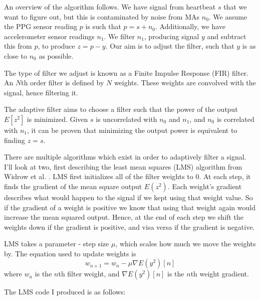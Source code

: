 \documentclass[12pt,a4paper,twoside,openany]{report}
\begin{document}
An overview of the algorithm follows. We have signal from heartbeat \(s\) that
we want to figure out, but this is contaminated by noise from MAs \(n_0\).
We assume the PPG sensor reading \(p\) is such that \(p=s+n_0\). Additionally,
we have accelerometer sensor readings \(n_1\). We filter \(n_1\), producing
signal \(y\) and subtract this from \(p\), to produce \(z=p-y\). Our aim is to
adjust the filter, such that \(y\) is as close to \(n_0\) as possible. 

The type of filter we adjust is known as a Finite Impulse Response (FIR)
filter. An \(N\)th order filter is defined by \(N\) weights.
These weights are convolved with the signal, hence filtering it.

The adaptive filter aims to choose a filter such that the power of the output 
\(E[z^2]\) is minimized. Given \(s\) is uncorrelated with \(n_0\) and \(n_1\), and \(n_0\)
is correlated with \(n_1\), it can be proven that minimizing the output power
is equivalent to finding \(z=s\).

There are multiple algorithms which exist in order to adaptively filter a
signal. I'll look at two, first describing the least mean squares (LMS) algorithm from
Widrow et al. \cite{WidrowLMS}. LMS first initializes all of the filter weights to 0. At each
step, it finds the gradient of the mean square output \(E(z^2)\).
Each weight's gradient describes what would happen to the signal if we kept
using that weight value. So if the gradient of a weight is positive we know
that using that weight again would increase the mean squared output. Hence, at
the end of each step we shift the weights down if the gradient is positive,
and visa versa if the gradient is negative.

LMS takes a parameter - step size \(\mu\), which scales how much we move the
weights by. The equation used to update weights is \[w_{n+1}=w_n-\mu \nabla
E(y^2)[n]\]
where \(w_n\) is the \(n\)th filter weight, and \(\nabla E(y^2)[n]\) is the
\(n\)th weight gradient.

The LMS code I produced is as follows:
\end{document}
